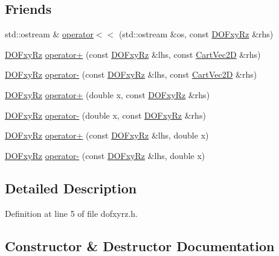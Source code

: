 \subsection*{Friends}
\begin{DoxyCompactItemize}
\item 
std\+::ostream \& \hyperlink{class_d_o_fxy_rz_a1ac21ee73e0159236cde20f41914a132}{operator$<$$<$} (std\+::ostream \&os, const \hyperlink{class_d_o_fxy_rz}{D\+O\+Fxy\+Rz} \&rhs)
\item 
\hyperlink{class_d_o_fxy_rz}{D\+O\+Fxy\+Rz} \hyperlink{class_d_o_fxy_rz_aea029119f4f15e337343dd9674c53314}{operator+} (const \hyperlink{class_d_o_fxy_rz}{D\+O\+Fxy\+Rz} \&lhs, const \hyperlink{class_cart_vec2_d}{Cart\+Vec2D} \&rhs)
\item 
\hyperlink{class_d_o_fxy_rz}{D\+O\+Fxy\+Rz} \hyperlink{class_d_o_fxy_rz_adb707d2ec2d85ef225d3ecedd0f72afa}{operator-\/} (const \hyperlink{class_d_o_fxy_rz}{D\+O\+Fxy\+Rz} \&lhs, const \hyperlink{class_cart_vec2_d}{Cart\+Vec2D} \&rhs)
\item 
\hyperlink{class_d_o_fxy_rz}{D\+O\+Fxy\+Rz} \hyperlink{class_d_o_fxy_rz_a3a29ac2f2a3ca9a5e9e960ce82f176bf}{operator+} (double x, const \hyperlink{class_d_o_fxy_rz}{D\+O\+Fxy\+Rz} \&rhs)
\item 
\hyperlink{class_d_o_fxy_rz}{D\+O\+Fxy\+Rz} \hyperlink{class_d_o_fxy_rz_af2be5dcffff5323bcbfcaf49a4c291e8}{operator-\/} (double x, const \hyperlink{class_d_o_fxy_rz}{D\+O\+Fxy\+Rz} \&rhs)
\item 
\hyperlink{class_d_o_fxy_rz}{D\+O\+Fxy\+Rz} \hyperlink{class_d_o_fxy_rz_a504a54dd40576418831f0383ebd9f93a}{operator+} (const \hyperlink{class_d_o_fxy_rz}{D\+O\+Fxy\+Rz} \&lhs, double x)
\item 
\hyperlink{class_d_o_fxy_rz}{D\+O\+Fxy\+Rz} \hyperlink{class_d_o_fxy_rz_a855ad18215b9bcfbc09ca9e5b532b9d4}{operator-\/} (const \hyperlink{class_d_o_fxy_rz}{D\+O\+Fxy\+Rz} \&lhs, double x)
\end{DoxyCompactItemize}


\subsection{Detailed Description}


Definition at line 5 of file dofxyrz.\+h.



\subsection{Constructor \& Destructor Documentation}
